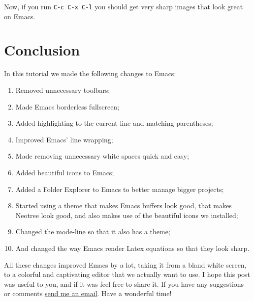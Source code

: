 \documentclass[12pt, a4paper]{article}
\begin{document}
Now, if you run \texttt{C-c C-x C-l} you should get very sharp images that look great on Emacs.

\section{Conclusion}
\label{sec:orgf6e39bd}

In this tutorial we made the following changes to Emacs:
\begin{enumerate}
\item Removed unnecessary toolbars;
\item Made Emacs borderless fullscreen;
\item Added highlighting to the current line and matching parentheses;
\item Improved Emacs' line wrapping;
\item Made removing unnecessary white spaces quick and easy;
\item Added beautiful icons to Emacs;
\item Added a Folder Explorer to Emacs to better manage bigger projects;
\item Started using a theme that makes Emacs buffers look good, that makes Neotree look good, and also makes use of the beautiful icons we installed;
\item Changed the mode-line so that it also has a theme;
\item And changed the way Emacs render Latex equations so that they look sharp.
\end{enumerate}

All these changes improved Emacs by a lot, taking it from a bland white screen, to a colorful and captivating editor that we actually want to use. I hope this post was useful to you, and if it was feel free to share it. If you have any suggestions or comments \href{http://guilhermesalome.com/index.html\#toContact}{send me an email}. Have a wonderful time!
\end{document}
